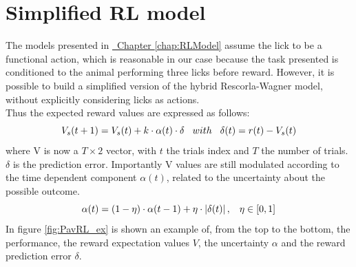 \chapter{Simplified RL model}
\label{chap:SimpRL}
The models presented in \hyperref[chap:RLModel]{~Chapter \ref*{chap:RLModel}} assume the lick to be a functional action, which is reasonable in our case because the task presented is conditioned to the animal performing three licks before reward. However, it is possible to build a simplified version of the hybrid Rescorla-Wagner model, without explicitly considering licks as actions.\\Thus the expected reward values are expressed as follows:
\begin{equation}
V_s(t+1)=V_s(t)+k\cdot\alpha(t)\cdot\delta  \hspace{0.3cm} with \hspace{0.3cm}\delta(t)=r(t)-V_s(t)
\label{VValues}
\end{equation}
where V is now a $
T\times 2$ vector, with $t$ the trials index and $T$ the number of trials. $\delta$ is the prediction error. Importantly V values are still modulated according to the time dependent component $\alpha(t)$, related to the uncertainty about the possible outcome.
\begin{equation}
    \alpha(t)=(1-\eta)\cdot\alpha(t-1)+\eta\cdot\left\lvert\delta(t)\right\rvert,\hspace{0.3cm} \eta\in[0,1]
\end{equation}
In figure \ref{fig:PavRL_ex} is shown an example of, from the top to the bottom, the performance, the reward expectation values $V$, the uncertainty $\alpha$ and the reward prediction error $\delta$.
